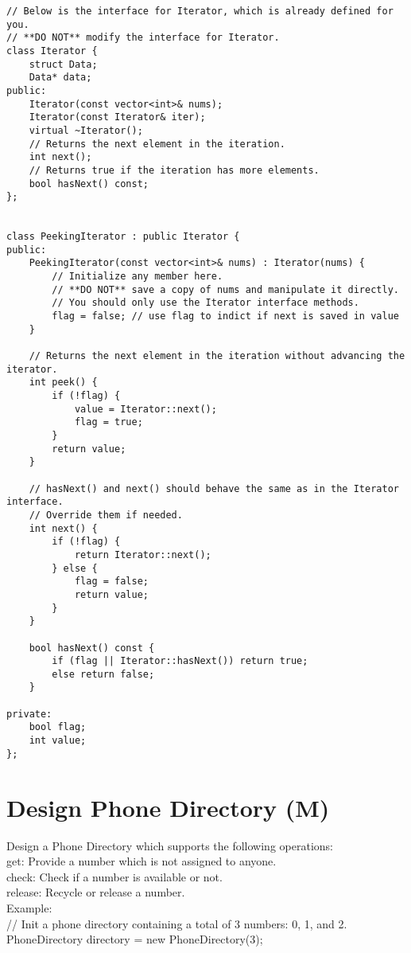 \begin{lstlisting}
// Below is the interface for Iterator, which is already defined for you.
// **DO NOT** modify the interface for Iterator.
class Iterator {
    struct Data;
	Data* data;
public:
	Iterator(const vector<int>& nums);
	Iterator(const Iterator& iter);
	virtual ~Iterator();
	// Returns the next element in the iteration.
	int next();
	// Returns true if the iteration has more elements.
	bool hasNext() const;
};


class PeekingIterator : public Iterator {
public:
	PeekingIterator(const vector<int>& nums) : Iterator(nums) {
	    // Initialize any member here.
	    // **DO NOT** save a copy of nums and manipulate it directly.
	    // You should only use the Iterator interface methods.
	    flag = false; // use flag to indict if next is saved in value
	}

    // Returns the next element in the iteration without advancing the iterator.
	int peek() {
        if (!flag) {
            value = Iterator::next();
            flag = true;
        }
        return value;
	}

	// hasNext() and next() should behave the same as in the Iterator interface.
	// Override them if needed.
	int next() {
	    if (!flag) {
	        return Iterator::next();
	    } else {
    	    flag = false;
	        return value;
	    }
	}

	bool hasNext() const {
	    if (flag || Iterator::hasNext()) return true;
	    else return false;
	}
	
private:
    bool flag;
    int value;
};
\end{lstlisting}


\section{Design Phone Directory (M)}
Design a Phone Directory which supports the following operations:\\
    get: Provide a number which is not assigned to anyone.\\
    check: Check if a number is available or not.\\
    release: Recycle or release a number.\\

Example:\\
// Init a phone directory containing a total of 3 numbers: 0, 1, and 2.\\
PhoneDirectory directory = new PhoneDirectory(3);\\

